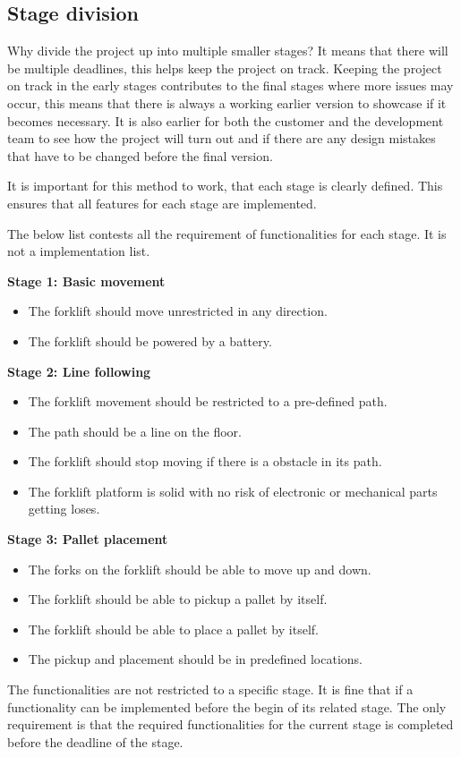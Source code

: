 \documentclass[../report.tex]{subfiles}
\begin{document}
    \subsection{Stage division}
    Why divide the project up into multiple smaller stages? It means
    that there will be multiple deadlines, this helps keep the project on
    track. Keeping the project on track in the early stages contributes to the
    final stages where more issues may occur, this means that there is always a
    working earlier version to showcase if it becomes necessary. It is also
    earlier for both the customer and the development team to see how the
    project will turn out and if there are any design mistakes that have to be
    changed before the final version.

    It is important for this method to work, that each stage is clearly defined.
    This ensures that all features for each stage are implemented.

    The below list contests all the requirement of functionalities for each
    stage. It is not a implementation list.

    \textbf{Stage 1: Basic movement}
    \begin{itemize}
        \item The forklift should move unrestricted in any direction.
        \item The forklift should be powered by a battery.
    \end{itemize}

    \textbf{Stage 2: Line following}
    \begin{itemize}
        \item The forklift movement should be restricted to a pre-defined path.
        \item The path should be a line on the floor.
        \item The forklift should stop moving if there is a obstacle in its path.
        \item The forklift platform is solid with no risk of electronic or
        mechanical parts getting loses.
    \end{itemize}

    \textbf{Stage 3: Pallet placement}
    \begin{itemize}
        \item The forks on the forklift should be able to move up and down.
        \item The forklift should be able to pickup a pallet by itself.
        \item The forklift should be able to place a pallet by itself.
        \item The pickup and placement should be in predefined locations.
    \end{itemize}

    The functionalities are not restricted to a specific stage. It is fine that
    if a functionality can be implemented before the begin of its related
    stage.
    The only requirement is that the required functionalities for the current
    stage is completed before the deadline of the stage. 
\end{document}
